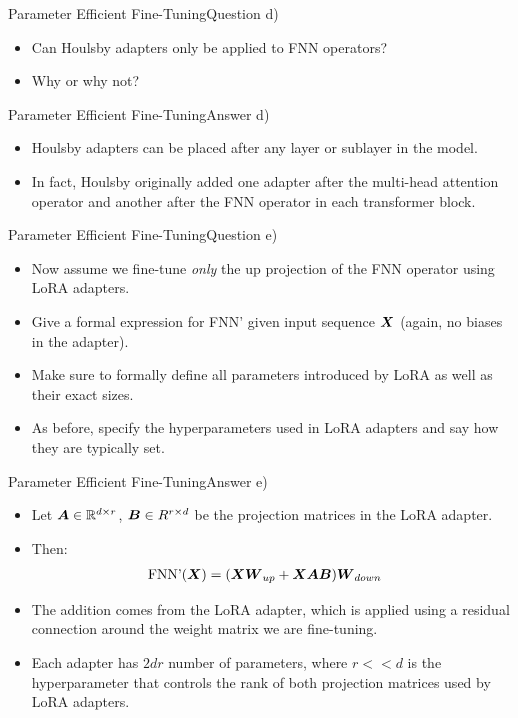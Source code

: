\documentclass[t]{beamer}
\newcommand\op[1]{\operatorname{#1}}
\begin{document}
\begin{frame}{Parameter Efficient Fine-Tuning}{Question d)}
    \begin{itemize}
        \item Can Houlsby adapters only be applied to FNN operators?
        \item Why or why not?
    \end{itemize}
\end{frame}

\begin{frame}{Parameter Efficient Fine-Tuning}{Answer d)}
    \begin{itemize}
        \item Houlsby adapters can be placed after any layer or sublayer in the
              model.
        \item In fact, Houlsby originally added one adapter after the
              multi-head attention operator and another after the FNN operator
              in each transformer block.
    \end{itemize}
\end{frame}

\begin{frame}{Parameter Efficient Fine-Tuning}{Question e)}
    \begin{itemize}
        \item Now assume we fine-tune \emph{only} the up projection of the FNN
              operator using LoRA adapters.
        \item Give a formal expression for FNN' given input sequence ${\boldsymbol{X}}$
              (again, no biases in the adapter).
        \item Make sure to formally define all parameters introduced by LoRA as
              well as their exact sizes.
        \item As before, specify the hyperparameters used in LoRA adapters and
              say how they are typically set.
    \end{itemize}
\end{frame}

\begin{frame}{Parameter Efficient Fine-Tuning}{Answer e)}
    \begin{itemize}
        \item Let ${\boldsymbol{A}} \in \mathbb{R}^{d\times r}$, ${\boldsymbol{B}} \in R^{r\times d}$ be the
              projection matrices in the LoRA adapter.
        \item Then:
              \begin{align}\label{lora}
                  \op{FNN'}(\mX) & = (\mX\mW_{up} + \mX\mA\mB)\mW_{down}
              \end{align}
        \item The addition comes from the LoRA adapter, which is applied using a
              residual connection around the weight matrix we are fine-tuning.
        \item Each adapter has $2dr$ number of parameters, where $r << d$ is
              the hyperparameter that controls the rank of both projection
              matrices used by LoRA adapters.
    \end{itemize}
\end{frame}
\end{document}
